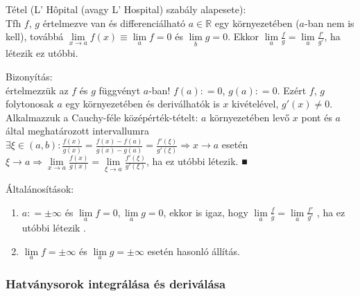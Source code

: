\documentclass[12pt,a4paper]{scrartcl}
\providecommand{\tightlist}{%
  \setlength{\itemsep}{0pt}\setlength{\parskip}{0pt}}
\newenvironment{tetel}{}{}
\newenvironment{bizonyitas}{}{}
\begin{document}
\begin{tetel}

Tétel (L' Hôpital (avagy L' Hospital) szabály alapesete):\\
Tfh \(f\), \(g\) értelmezve van és differenciálható
\(a \in {\mathbb{R}}\) egy környezetében (\(a\)-ban nem is kell),
továbbá
\(\underset{x\rightarrow a}{\lim}f\left( x \right) \equiv \underset{a}{\lim}f = 0\)
és \(\underset{b}{\lim}g = 0\). Ekkor
\(\underset{a}{\lim}\frac{f}{g} = \underset{a}{\lim}\frac{f'}{g'}\), ha
létezik ez utóbbi.

\end{tetel}

\begin{bizonyitas}

Bizonyítás:\\
értelmezzük az \(f\) és \(g\) függvényt \(a\)-ban!
\(f\left( a \right): = 0\), \(g\left( a \right): = 0\). Ezért \(f\),
\(g\) folytonosak \(a\) egy környezetében és deriválhatók is \(x\)
kivételével, \(g'\left( x \right) \neq 0\). Alkalmazzuk a Cauchy-féle
középérték-tételt: \(a\) környezetében levő \(x\) pont és \(a\) által
meghatározott intervallumra
\(\left. \exists\xi \in \left( {a,b} \right):\frac{f\left( x \right)}{g\left( x \right)} = \frac{f\left( x \right) - f\left( a \right)}{g\left( x \right) - g\left( a \right)} = \frac{f'\left( \xi \right)}{g'\left( \xi \right)}\Rightarrow x\rightarrow a \right.\)
esetén
\(\left. \xi\rightarrow a\Rightarrow\underset{x\rightarrow a}{\lim}\frac{f\left( x \right)}{g\left( x \right)} = \underset{\xi\rightarrow a}{\lim}\frac{f'\left( \xi \right)}{g'\left( \xi \right)} \right.\),
ha ez utóbbi létezik. ■

\end{bizonyitas}

Általánosítások:

\begin{enumerate}
\def\labelenumi{\arabic{enumi}.}
\tightlist
\item
  \(a: = \pm \infty\) és
  \(\underset{a}{\lim}f = 0,\underset{a}{\lim}g = 0\), ekkor is igaz,
  hogy
  \(\underset{a}{\lim}\frac{f}{g} = \underset{a}{\lim}\frac{f'}{g'}\) ,
  ha ez utóbbi létezik .
\item
  \(\underset{a}{\lim}f = \pm \infty\) és
  \(\underset{a}{\lim}g = \pm \infty\) esetén hasonló állítás.
\end{enumerate}

\hypertarget{hatvanysorok-integralasa-es-derivalasa}{%
\subsubsection{Hatványsorok integrálása és
deriválása}\label{hatvanysorok-integralasa-es-derivalasa}}
\end{document}
